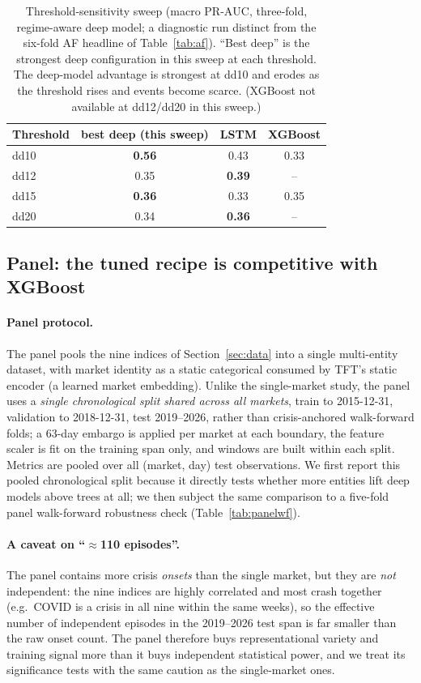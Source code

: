 \documentclass[11pt,a4paper]{article}
\newcommand{\prauc}{\mbox{PR-AUC}}
\begin{document}
\begin{table}[h]
\centering\small
\caption{Threshold-sensitivity sweep (macro $\prauc$, three-fold, regime-aware
deep model; a diagnostic run distinct from the six-fold AF headline of
Table~\ref{tab:af}). ``Best deep'' is the strongest deep configuration in this
sweep at each threshold. The deep-model advantage is strongest at dd10 and
erodes as the threshold rises and events become scarce. (XGBoost not available
at dd12/dd20 in this sweep.)}
\label{tab:thr-sens}
\begin{tabular}{lccc}
\toprule
Threshold & best deep (this sweep) & LSTM & XGBoost \\
\midrule
dd10 & \textbf{0.56} & 0.43 & 0.33 \\
dd12 & 0.35 & \textbf{0.39} & -- \\
dd15 & \textbf{0.36} & 0.33 & 0.35 \\
dd20 & 0.34 & \textbf{0.36} & -- \\
\bottomrule
\end{tabular}
\end{table}

\subsection{Panel: the tuned recipe is competitive with XGBoost}
\label{sec:res-panel}

\paragraph{Panel protocol.} The panel pools the nine indices of
Section~\ref{sec:data} into a single multi-entity dataset, with market identity
as a static categorical consumed by TFT's static encoder (a learned market
embedding). Unlike the single-market study, the panel uses a \emph{single
chronological split shared across all markets}, train to 2015-12-31,
validation to 2018-12-31, test 2019--2026, rather than crisis-anchored
walk-forward folds; a 63-day embargo is applied per market at each boundary,
the feature scaler is fit on the training span only, and windows are built
within each split. Metrics are pooled over all (market, day) test
observations. We first report this pooled chronological split because it
directly tests whether more entities lift deep models above trees at all; we
then subject the same comparison to a five-fold panel walk-forward robustness
check (Table~\ref{tab:panelwf}).

\paragraph{A caveat on ``$\approx$110 episodes''.} The panel contains more
crisis \emph{onsets} than the single market, but they are \emph{not}
independent: the nine indices are highly correlated and most crash together
(e.g.\ COVID is a crisis in all nine within the same weeks), so the effective
number of independent episodes in the 2019--2026 test span is far smaller than
the raw onset count. The panel therefore buys representational variety and
training signal more than it buys independent statistical power, and we treat
its significance tests with the same caution as the single-market ones.
\end{document}
